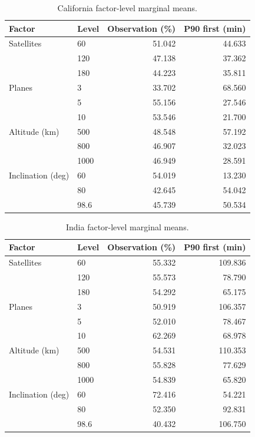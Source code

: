 \begin{table}[htbp]
\centering
\caption{California factor-level marginal means.}
\label{tab:factor_ca}
\begin{tabular}{llrr}
\toprule
Factor & Level & Observation (\%) & P90 first (min) \\
\midrule
Satellites & 60 & 51.042 & 44.633 \\
 & 120 & 47.138 & 37.362 \\
 & 180 & 44.223 & 35.811 \\
Planes & 3 & 33.702 & 68.560 \\
 & 5 & 55.156 & 27.546 \\
 & 10 & 53.546 & 21.700 \\
Altitude (km) & 500 & 48.548 & 57.192 \\
 & 800 & 46.907 & 32.023 \\
 & 1000 & 46.949 & 28.591 \\
Inclination (deg) & 60 & 54.019 & 13.230 \\
 & 80 & 42.645 & 54.042 \\
 & 98.6 & 45.739 & 50.534 \\
\bottomrule
\end{tabular}
\end{table}

\begin{table}[htbp]
\centering
\caption{India factor-level marginal means.}
\label{tab:factor_in}
\begin{tabular}{llrr}
\toprule
Factor & Level & Observation (\%) & P90 first (min) \\
\midrule
Satellites & 60 & 55.332 & 109.836 \\
 & 120 & 55.573 & 78.790 \\
 & 180 & 54.292 & 65.175 \\
Planes & 3 & 50.919 & 106.357 \\
 & 5 & 52.010 & 78.467 \\
 & 10 & 62.269 & 68.978 \\
Altitude (km) & 500 & 54.531 & 110.353 \\
 & 800 & 55.828 & 77.629 \\
 & 1000 & 54.839 & 65.820 \\
Inclination (deg) & 60 & 72.416 & 54.221 \\
 & 80 & 52.350 & 92.831 \\
 & 98.6 & 40.432 & 106.750 \\
\bottomrule
\end{tabular}
\end{table}

